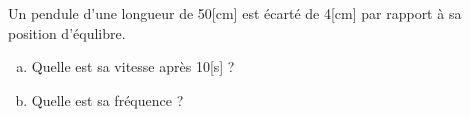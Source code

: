 %
%
    Un pendule d'une longueur de 50[cm] est écarté de 4[cm] par rapport à sa position d'équlibre.
    \begin{enumerate}[a)]
        \item Quelle est sa vitesse après 10[s] ?
        \item Quelle est sa fréquence ?
    \end{enumerate}
